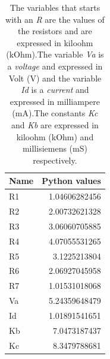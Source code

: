 \begin{table}[h]
  \centering
  \begin{tabular}{|l|r|}
    \hline    
    {\bf Name} & {\bf Python values} \\ \hline
	R1 &  1.04606282456 \\ 
	R2 &  2.00732621328 \\ 
	R3 &  3.06060705885 \\ 
	R4 &  4.07055531265 \\ 
	R5 &  3.1225213804 \\ 
	R6 &  2.06927045958 \\ 
	R7 &  1.01531018068 \\ 
	Va &  5.24359648479 \\ 
	Id &  1.01891541651 \\ 
	Kb &  7.0473187437 \\ 
	Kc &  8.3479788681 \\ 
	\hline
  \end{tabular}
  \caption{The variables that starts with an {\it R} are the values of the resistors 
    and are expressed in  kiloohm  (kOhm).The variable {\it Va}  is a {\it voltage} and expressed in
    Volt (V) and the variable {\it Id}  is a {\it current} and expressed in
   milliampere (mA).The constants {\it Kc} and {\it Kb} are  expressed in
   kiloohm  (kOhm) and millisiemens (mS) respectively. }
  \label{tab:python_values}
\end{table}

\pagebreak


